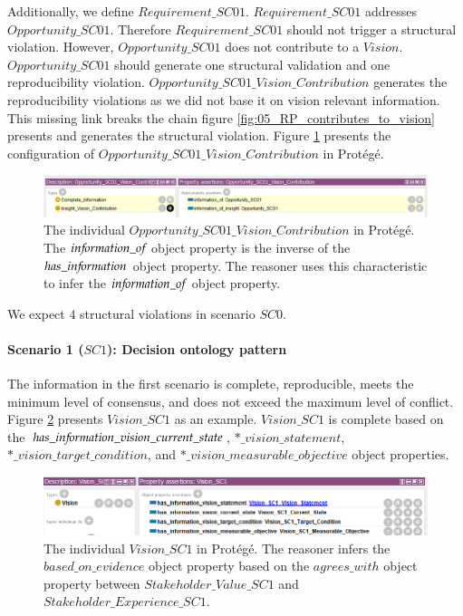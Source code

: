 Additionally, we define $Requirement\_SC01$. $Requirement\_SC01$ addresses $Opportunity\_SC01$. Therefore $Requirement\_SC01$ should not trigger a structural violation. However, $Opportunity\_SC01$ does not contribute to a $Vision$. $Opportunity\_SC01$ should generate one structural validation and one reproducibility violation. $Opportunity\_SC01\_Vision\_Contribution$ generates the reproducibility violations as we did not base it on vision relevant information. This missing link breaks the chain figure \ref{fig:05_RP_contributes_to_vision} presents and generates the structural violation. Figure \ref{fig:RP_SC0_Opportunity_SC01_Vision_Contribution} presents the configuration of $Opportunity\_SC01\_Vision\_Contribution$ in Prot\'eg\'e.

\begin{figure}[H]
\centering
  \includegraphics[width=17cm]{../../Images/05_Validation/05_RP_Opportunity_SC01_Vision_Contribution}
  \caption{The individual $Opportunity\_SC01\_Vision\_Contribution$ in Prot\'eg\'e. The $in{\mkern-2mu f\mkern-3mu}ormation\_o{\mkern-2mu f\mkern-3mu}$ object property is the inverse of the $has\_in{\mkern-2mu f\mkern-3mu}ormation$ object property. The reasoner uses this characteristic to infer the $in{\mkern-2mu f\mkern-3mu}ormation\_o{\mkern-2mu f\mkern-3mu}$ object property. }
  \label{fig:RP_SC0_Opportunity_SC01_Vision_Contribution}
\end{figure}

We expect $4$ structural violations in scenario $SC0$.

\paragraph{Scenario 1 ($SC1$): Decision ontology pattern}
The information in the first scenario is complete, reproducible, meets the minimum level of consensus, and does not exceed the maximum level of conflict. Figure \ref{fig:RP_SC1_Vision} presents $Vision\_SC1$ as an example. $Vision\_SC1$ is complete based on the $has\_in{\mkern-2mu f\mkern-3mu}ormation\_vision\_current\_state$, $*\_vision\_statement$, $*\_vision\_target\_condition$, and $*\_vision\_measurable\_objective$ object properties.

\begin{figure}[H]
\centering
  \includegraphics[width=17cm]{../../Images/05_Validation/05_RP_SC1_Vision_SC1.png}
  \caption{The individual $Vision\_SC1$ in Prot\'eg\'e. The reasoner infers the $based\_on\_evidence$ object property based on the $agrees\_with$ object property between $Stakeholder\_Value\_SC1$ and $Stakeholder\_Experience\_SC1$.}
  \label{fig:RP_SC1_Vision}
\end{figure}

